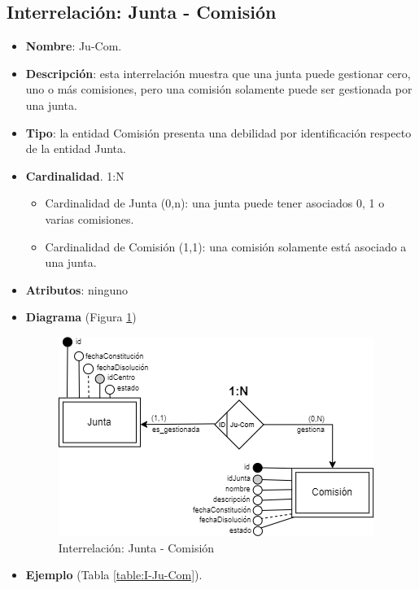 \subsection{Interrelación: Junta - Comisión}
\begin{itemize}
    \item \textbf{Nombre}: Ju-Com.
    \item \textbf{Descripción}: esta interrelación muestra que una junta puede gestionar cero, uno o más comisiones, pero una comisión solamente puede ser gestionada por una junta.
    \item \textbf{Tipo}: la entidad Comisión presenta una debilidad por identificación respecto de la entidad Junta.
    \item \textbf{Cardinalidad}. 1:N
    \begin{itemize}
        \item Cardinalidad de Junta (0,n): una junta puede tener asociados 0, 1 o varias comisiones.
        \item Cardinalidad de Comisión (1,1): una comisión solamente está asociado a una junta.
    \end{itemize}
    \item \textbf{Atributos}: ninguno
    \item \textbf{Diagrama} (Figura \ref{fig:I-Ju-Com}) 
    \begin{figure}[H]
        \centering
        \includegraphics[scale=0.7]{img/diagramas/EER/I-Ju-Com}
        \caption{Interrelación: Junta - Comisión}
        \label{fig:I-Ju-Com}
    \end{figure}
    
    \item \textbf{Ejemplo} (Tabla \ref{table:I-Ju-Com}).


\end{itemize}
